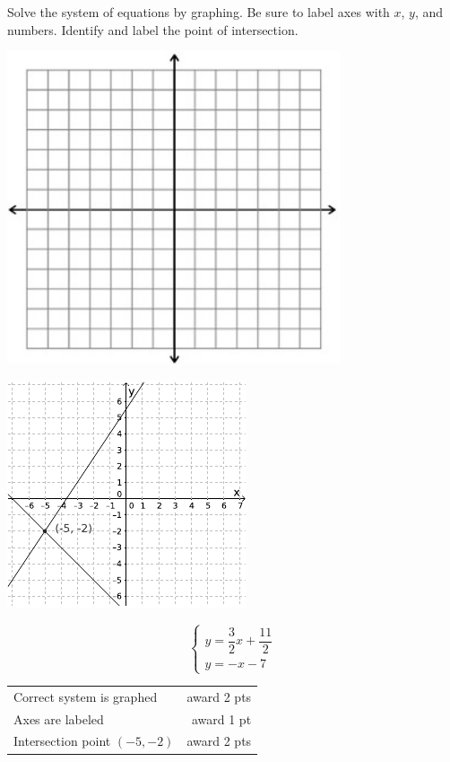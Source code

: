 {
	Solve the system of equations by graphing. Be sure to label axes with $x$, $y$, and numbers. Identify and label the point of intersection. \begin{onlyproblem}\begin{center}\includegraphics{fig-graphpaper.png}\end{center}\end{onlyproblem} \begin{onlysolution}\begin{center}\includegraphics{fig095-10-5-b-answer}\end{center}\end{onlysolution}
	$$\begin{cases} y=\dfrac{3}{2}x+\dfrac{11}{2}\\ y=-x-7\end{cases}$$
}
{
	\begin{tabular}{l r}
	Correct system is graphed & award 2 pts\\
	Axes are labeled & award 1 pt\\
	Intersection point $(-5,-2)$ & award 2 pts
	\end{tabular}
}

